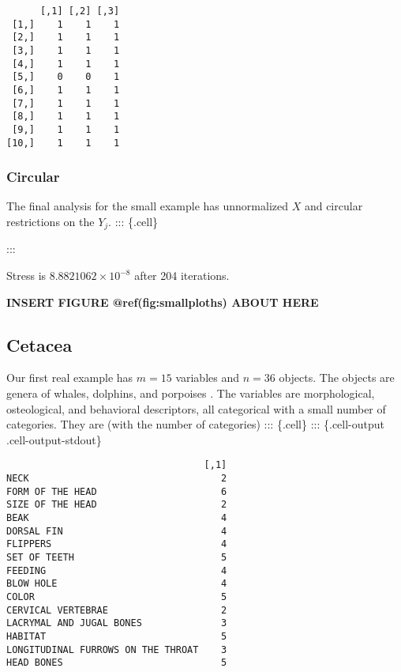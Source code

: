 \documentclass[
  12pt,
  letterpaper,
  DIV=11,
  numbers=noendperiod]{scrartcl}
\begin{document}
\begin{verbatim}
      [,1] [,2] [,3]
 [1,]    1    1    1
 [2,]    1    1    1
 [3,]    1    1    1
 [4,]    1    1    1
 [5,]    0    0    1
 [6,]    1    1    1
 [7,]    1    1    1
 [8,]    1    1    1
 [9,]    1    1    1
[10,]    1    1    1
\end{verbatim}

\subsubsection{Circular}\label{circular}

The final analysis for the small example has unnormalized \(X\) and
circular restrictions on the \(Y_j\). ::: \{.cell\}

:::

Stress is \ensuremath{8.8821062\times 10^{-8}} after 204 iterations.

\begin{greybox}

\begin{center}
\textbf{INSERT FIGURE @ref(fig:smallploths) ABOUT HERE}

\end{center}

\end{greybox}

\subsection{Cetacea}\label{cetacea}

Our first real example has \(m=15\) variables and \(n=36\) objects. The
objects are genera of whales, dolphins, and porpoises . The variables
are morphological, osteological, and behavioral descriptors, all
categorical with a small number of categories. They are (with the number
of categories) ::: \{.cell\} ::: \{.cell-output .cell-output-stdout\}

\begin{verbatim}
                                   [,1]
NECK                                  2
FORM OF THE HEAD                      6
SIZE OF THE HEAD                      2
BEAK                                  4
DORSAL FIN                            4
FLIPPERS                              4
SET OF TEETH                          5
FEEDING                               4
BLOW HOLE                             4
COLOR                                 5
CERVICAL VERTEBRAE                    2
LACRYMAL AND JUGAL BONES              3
HABITAT                               5
LONGITUDINAL FURROWS ON THE THROAT    3
HEAD BONES                            5
\end{verbatim}
\end{document}

